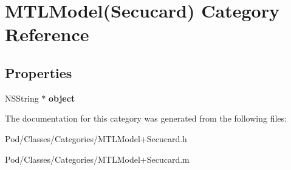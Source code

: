 \hypertarget{category_m_t_l_model_07_secucard_08}{}\section{M\+T\+L\+Model(Secucard) Category Reference}
\label{category_m_t_l_model_07_secucard_08}
\subsection*{Properties}
\begin{DoxyCompactItemize}
\item 
N\+S\+String $\ast$ {\bfseries object}\hypertarget{category_m_t_l_model_07_secucard_08_a1c214448c5a6f695217e1e70d26a20e0}{}\label{category_m_t_l_model_07_secucard_08_a1c214448c5a6f695217e1e70d26a20e0}

\end{DoxyCompactItemize}


The documentation for this category was generated from the following files\+:\begin{DoxyCompactItemize}
\item 
Pod/\+Classes/\+Categories/M\+T\+L\+Model+\+Secucard.\+h\item 
Pod/\+Classes/\+Categories/M\+T\+L\+Model+\+Secucard.\+m\end{DoxyCompactItemize}
